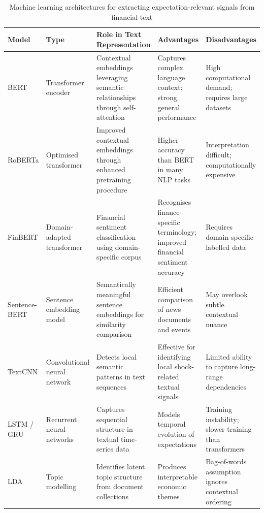 \documentclass[journal]{IEEEtran}
\begin{document}
\begin{table}[H]
\centering
\caption{Machine learning architectures for extracting expectation-relevant signals from financial text}
\label{tab:ml_models_appendix}

\small
\setlength{\tabcolsep}{4pt}
\renewcommand{\arraystretch}{1.08}

\begin{tabular}{p{2.2cm} p{2.4cm} p{4.6cm} p{3.1cm} p{3.1cm}}
\toprule
\textbf{Model} & \textbf{Type} & \textbf{Role in Text Representation} & \textbf{Advantages} & \textbf{Disadvantages} \\
\midrule

BERT & Transformer encoder & Contextual embeddings leveraging semantic relationships through self-attention \cite{Devlin2019} & Captures complex language context; strong general performance & High computational demand; requires large datasets \\

RoBERTa & Optimised transformer & Improved contextual embeddings through enhanced pretraining procedure \cite{Liu2019Roberta} & Higher accuracy than BERT in many NLP tasks & Interpretation difficult; computationally expensive \\

FinBERT & Domain-adapted transformer & Financial sentiment classification using domain-specific corpus \cite{Araci2019} & Recognises finance-specific terminology; improved financial sentiment accuracy & Requires domain-specific labelled data \\

Sentence-BERT & Sentence embedding model & Semantically meaningful sentence embeddings for similarity comparison \cite{Reimers2019} & Efficient comparison of news documents and events & May overlook subtle contextual nuance \\

TextCNN & Convolutional neural network & Detects local semantic patterns in text sequences \cite{Kim2014CNN} & Effective for identifying local shock-related textual signals & Limited ability to capture long-range dependencies \\

LSTM / GRU & Recurrent neural networks & Captures sequential structure in textual time-series data \cite{Hochreiter1997,Cho2014GRU} & Models temporal evolution of expectations & Training instability; slower training than transformers \\

LDA & Topic modelling & Identifies latent topic structure from document collections \cite{Blei2003LDA} & Produces interpretable economic themes & Bag-of-words assumption ignores contextual ordering \\


\end{tabular}
\end{table}
\end{document}
